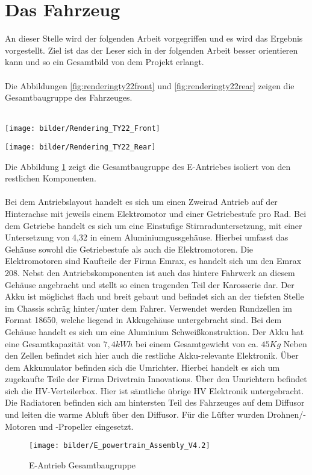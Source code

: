 \section{Das Fahrzeug}
An dieser Stelle wird der folgenden Arbeit vorgegriffen und es wird das Ergebnis vorgestellt. Ziel ist das der Leser sich in der folgenden Arbeit besser orientieren kann und so ein Gesamtbild von dem Projekt erlangt.\\
\\
Die Abbildungen \ref{fig:renderingty22front} und \ref{fig:renderingty22rear} zeigen die Gesamtbaugruppe des Fahrzeuges.\\
\\
	\begin{minipage}[b]{.5\linewidth} %
			\texttt{[image: bilder/Rendering\_TY22\_Front]}
			\label{fig:renderingty22front}
	\end{minipage}
	\begin{minipage}[b]{.5\linewidth} %
			\texttt{[image: bilder/Rendering\_TY22\_Rear]}
			\label{fig:renderingty22rear}
	\end{minipage}

Die Abbildung \ref{fig:epowertrainassemblyv4} zeigt die Gesamtbaugruppe des E-Antriebes isoliert von den restlichen Komponenten.\\
\\
Bei dem Antriebslayout handelt es sich um einen Zweirad Antrieb auf der Hinterachse mit jeweils einem Elektromotor und einer Getriebestufe pro Rad. Bei dem Getriebe handelt es sich um eine Einstufige Stirnraduntersetzung, mit einer Untersetzung von 4,32 in einem Aluminiumgussgehäuse. Hierbei umfasst das Gehäuse sowohl die Getriebestufe als auch die Elektromotoren. Die Elektromotoren sind Kaufteile der Firma Emrax, es handelt sich um den Emrax 208. Nebst den Antriebskomponenten ist auch das hintere Fahrwerk an diesem Gehäuse angebracht und stellt so einen tragenden Teil der Karosserie dar. Der Akku ist möglichst flach und breit gebaut und befindet sich an der tiefsten Stelle im Chassis schräg hinter/unter dem Fahrer. Verwendet werden Rundzellen im Format 18650, welche liegend in Akkugehäuse untergebracht sind. Bei dem Gehäuse handelt es sich um eine Aluminium Schweißkonstruktion. Der Akku hat eine Gesamtkapazität von \ensuremath{7,4 kWh} bei einem Gesamtgewicht von ca. \ensuremath{45 Kg} Neben den Zellen befindet sich hier auch die restliche Akku-relevante Elektronik. Über dem Akkumulator befinden sich die Umrichter. Hierbei handelt es sich um zugekaufte Teile der Firma Drivetrain Innovations. Über den Umrichtern befindet sich die \ac{HV}-Verteilerbox. Hier ist sämtliche übrige \ac{HV} Elektronik untergebracht. Die Radiatoren befinden sich am hintersten Teil des Fahrzeuges auf dem Diffusor und leiten die warme Abluft über den Diffusor. Für die Lüfter wurden Drohnen/-Motoren und -Propeller eingesetzt.

\begin{figure}
	\centering
	\texttt{[image: bilder/E\_powertrain\_Assembly\_V4.2]}
	\caption{E-Antrieb Gesamtbaugruppe}
	\label{fig:epowertrainassemblyv4}
\end{figure}

\FloatBarrier